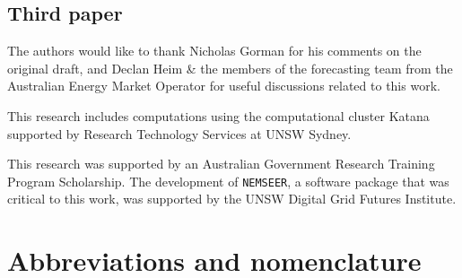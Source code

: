 \documentclass[12pt,a4paper,]{report}
\begin{document}
\hypertarget{third-paper}{%
\section*{Third paper}\label{third-paper}}

The authors would like to thank Nicholas Gorman for his comments on the
original draft, and Declan Heim \& the members of the forecasting team
from the Australian Energy Market Operator for useful discussions
related to this work.

This research includes computations using the computational cluster
Katana supported by Research Technology Services at UNSW Sydney.

This research was supported by an Australian Government Research
Training Program Scholarship. The development of \texttt{NEMSEER}, a
software package that was critical to this work, was supported by the
UNSW Digital Grid Futures Institute. \newpage


\tableofcontents

\newpage

\listoffigures

\newpage

\listoftables

\newpage

\hypertarget{abbreviations-and-nomenclature}{%
\chapter*{Abbreviations and
nomenclature}\label{abbreviations-and-nomenclature}}
\end{document}
